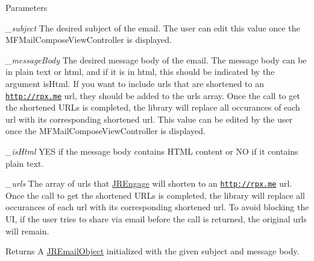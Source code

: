 \begin{DoxyParams}{Parameters}
\item[{\em \_\-subject}]The desired subject of the email. The user can edit this value once the MFMailComposeViewController is displayed.\item[{\em \_\-messageBody}]The desired message body of the email. The message body can be in plain text or html, and if it is in html, this should be indicated by the argument {\ttfamily isHtml}. If you want to include urls that are shortened to an \href{http://rpx.me}{\tt http://rpx.me} url, they should be added to the {\ttfamily urls} array. Once the call to get the shortened URLs is completed, the library will replace all occurances of each url with its corresponding shortened url. This value can be edited by the user once the MFMailComposeViewController is displayed.\item[{\em \_\-isHtml}]YES if the message body contains HTML content or NO if it contains plain text.\item[{\em \_\-urls}]The array of urls that \hyperlink{interface_j_r_engage}{JREngage} will shorten to an \href{http://rpx.me}{\tt http://rpx.me} url. Once the call to get the shortened URLs is completed, the library will replace all occurances of each url with its corresponding shortened url. To avoid blocking the UI, if the user tries to share via email before the call is returned, the original urls will remain.\end{DoxyParams}
\begin{DoxyReturn}{Returns}
A \hyperlink{interface_j_r_email_object}{JREmailObject} initialized with the given subject and message body. 
\end{DoxyReturn}


